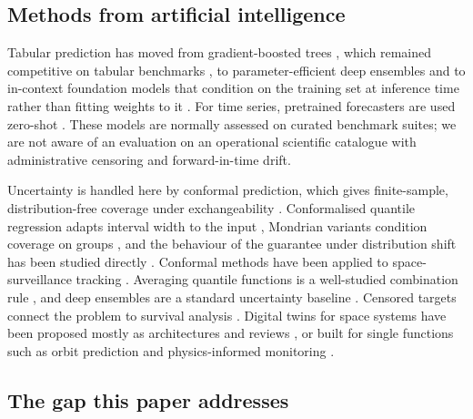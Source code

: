 \documentclass[3p,times,twocolumn]{elsarticle}
\begin{document}
\subsection{Methods from artificial
intelligence}\label{methods-from-artificial-intelligence}

Tabular prediction has moved from gradient-boosted trees
\citep{chen2016xgboost, ke2017lightgbm, prokhorenkova2018catboost},
which remained competitive on tabular benchmarks
\citep{grinsztajn2022tree}, to parameter-efficient deep ensembles
\citep{gorishniy2025tabm} and to in-context foundation models that
condition on the training set at inference time rather than fitting
weights to it
\citep{hollmann2025accurate, qu2025tabicl, qu2026tabiclv2, nvidia2026kumo}.
For time series, pretrained forecasters are used zero-shot
\citep{ansari2024chronos, ansari2025chronos2}. These models are normally
assessed on curated benchmark suites; we are not aware of an evaluation
on an operational scientific catalogue with administrative censoring and
forward-in-time drift.

Uncertainty is handled here by conformal prediction, which gives
finite-sample, distribution-free coverage under exchangeability
\citep{vovk2005algorithmic, angelopoulos2023gentle}. Conformalised
quantile regression adapts interval width to the input
\citep{romano2019cqr}, Mondrian variants condition coverage on groups
\citep{vovk2005algorithmic}, and the behaviour of the guarantee under
distribution shift has been studied directly
\citep{barber2023, candes2023conformalized, gibbs2021aci}. Conformal
methods have been applied to space-surveillance tracking
\citep{laxhammar2010conformal, laxhammar2015inductive}. Averaging
quantile functions is a well-studied combination rule
\citep{lichtendahl2013average}, and deep ensembles are a standard
uncertainty baseline \citep{lakshminarayanan2017ensembles}. Censored
targets connect the problem to survival analysis
\citep{harrell1982evaluating, barnwal2022survival}. Digital twins for
space systems have been proposed mostly as architectures and reviews
\citep{liu2024digital, guimaraes2023taxonomy}, or built for single
functions such as orbit prediction \citep{xu2025digital} and
physics-informed monitoring \citep{em2026physics}.

\subsection{The gap this paper
addresses}\label{the-gap-this-paper-addresses}
\end{document}
